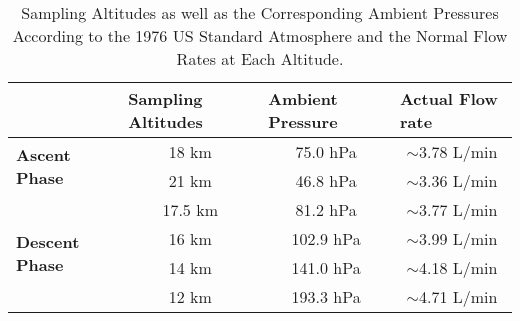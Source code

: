 
\begin{table}[H]
\centering
\begin{tabular}{|l|c|c|c|}
\hline
 & \multicolumn{1}{l|}{\textbf{Sampling Altitudes}} & \multicolumn{1}{l|}{\textbf{Ambient Pressure}} & \multicolumn{1}{l|}{\textbf{Actual Flow rate}} \\ \hline
\multirow{2}{*}{\textbf{Ascent Phase}} & 18 km & 75.0 hPa & $\sim$3.78 L/min \\ \cline{2-4} 
 & 21 km & 46.8 hPa & $\sim$3.36 L/min \\ \hline
\multirow{4}{*}{\textbf{Descent Phase}} & 17.5 km & 81.2 hPa & $\sim$3.77 L/min \\ \cline{2-4} 
 & 16 km & 102.9 hPa & $\sim$3.99 L/min \\ \cline{2-4} 
 & 14 km & 141.0 hPa & $\sim$4.18 L/min \\ \cline{2-4} 
 & 12 km & 193.3 hPa & $\sim$4.71 L/min \\ \hline
\end{tabular}
\caption{Sampling Altitudes as well as the Corresponding Ambient Pressures According to the 1976 US Standard Atmosphere and the Normal Flow Rates at Each Altitude.}
\label{tab:flowratetest}
\end{table}